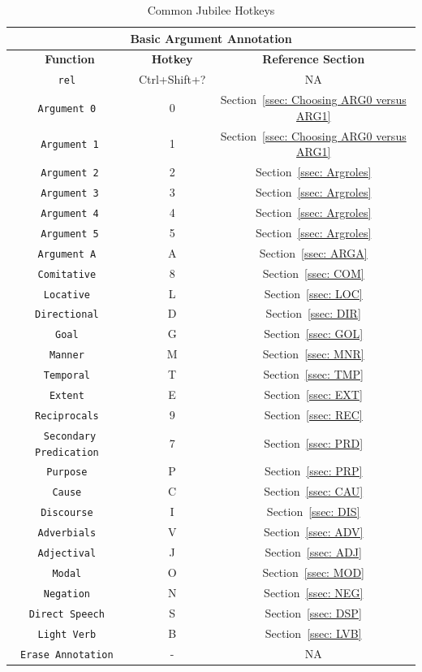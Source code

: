 \documentclass[11pt]{report}
\begin{document}
\begin{table}[htdp]
\centering
\begin{tabular}{|c|c|c|}
\hline \multicolumn{3}{|c|}{\textbf{Basic Argument Annotation}} \\
\hline \textbf{Function} & \textbf{Hotkey} & \textbf{Reference Section} \\
\hline \tt rel & Ctrl+Shift+? & NA \\
\hline \tt Argument 0 & 0 & Section~\ref{ssec: Choosing ARG0 versus ARG1} \\
\hline \tt Argument 1& 1 & Section~\ref{ssec: Choosing ARG0 versus ARG1} \\
\hline \tt Argument 2& 2 & Section~\ref{ssec: Argroles} \\
\hline \tt Argument 3& 3 & Section~\ref{ssec: Argroles} \\
\hline \tt Argument 4& 4 & Section~\ref{ssec: Argroles} \\
\hline \tt Argument 5& 5 & Section~\ref{ssec: Argroles} \\
\hline \tt Argument A & A & Section~\ref{ssec: ARGA} \\
\hline \tt Comitative & 8 & Section~\ref{ssec: COM} \\
\hline \tt Locative & L & Section~\ref{ssec: LOC} \\
\hline \tt Directional & D & Section~\ref{ssec: DIR} \\
\hline \tt Goal & G & Section~\ref{ssec: GOL} \\
\hline \tt Manner & M & Section~\ref{ssec: MNR} \\
\hline \tt Temporal & T & Section~\ref{ssec: TMP} \\
\hline \tt Extent & E & Section~\ref{ssec: EXT} \\
\hline \tt Reciprocals & 9 & Section~\ref{ssec: REC} \\
\hline \tt Secondary Predication & 7 & Section~\ref{ssec: PRD} \\
\hline \tt Purpose & P & Section~\ref{ssec: PRP} \\
\hline \tt Cause & C & Section~\ref{ssec: CAU} \\
\hline \tt Discourse & I & Section~\ref{ssec: DIS} \\
\hline \tt Adverbials & V & Section~\ref{ssec: ADV} \\
\hline \tt Adjectival & J & Section~\ref{ssec: ADJ} \\
\hline \tt Modal & O & Section~\ref{ssec: MOD} \\
\hline \tt Negation & N & Section~\ref{ssec: NEG} \\
\hline \tt Direct Speech & S & Section~\ref{ssec: DSP} \\
\hline \tt Light Verb & B & Section~\ref{ssec: LVB} \\
\hline \tt Erase Annotation & - & NA \\
\hline 
\end{tabular}
\label{tbl: JubHotkeys1}
\caption{Common Jubilee Hotkeys}
\end{table} 
\end{document}
